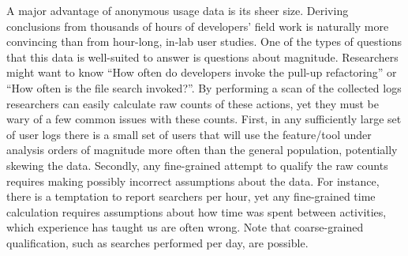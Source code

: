

A major advantage of anonymous usage data is its sheer size. Deriving conclusions from thousands of hours of developers' field work is naturally more convincing than from hour-long, in-lab user studies. One of the types of questions that this data is well-suited to answer is questions about magnitude. Researchers might want to know ``How often do developers invoke the pull-up refactoring'' or ``How often is the file search invoked?''. By performing a scan of the collected logs researchers can easily calculate raw counts of these actions, yet they must be wary of a few common issues with these counts. First, in any sufficiently large set of user logs there is a small set of users that will use the feature/tool under analysis orders of magnitude more often than the general population, potentially skewing the data. Secondly, any fine-grained attempt to qualify the raw counts requires making possibly incorrect assumptions about the data. For instance, there is a temptation to report searchers per hour, yet any fine-grained time calculation requires assumptions about how time was spent between activities, which experience has taught us are often wrong. Note that coarse-grained qualification, such as searches performed per day, are possible.   

